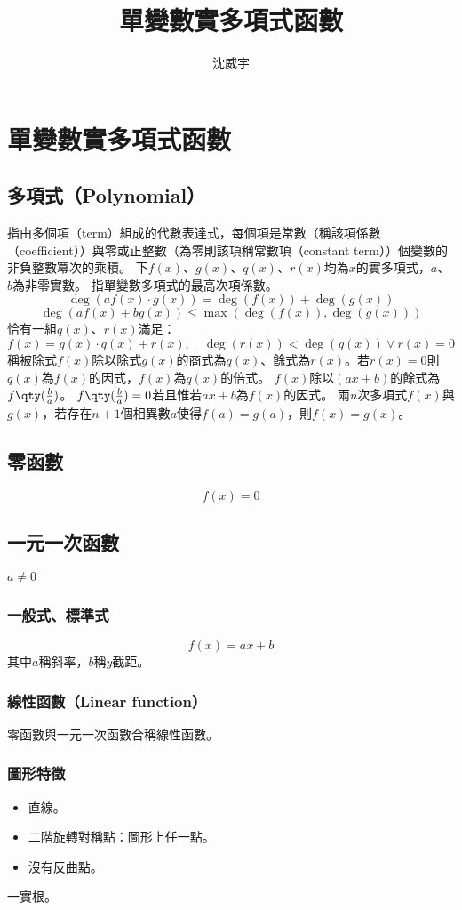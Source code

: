 \documentclass[a4paper,12pt]{report}
\begin{document}
\title{單變數實多項式函數}
\author{沈威宇}
\date{\temtoday}
\titletocdoc
\section{單變數實多項式函數}
\subsection{多項式（Polynomial）}
指由多個項（term）組成的代數表達式，每個項是常數（稱該項係數（coefficient））與零或正整數（為零則該項稱常數項（constant term））個變數的非負整數冪次的乘積。 
下$f(x)$、$g(x)$、$q(x)$、$r(x)$均為$x$的實多項式，$a$、$b$為非零實數。
指單變數多項式的最高次項係數。
\[\deg(af(x)\cdot g(x))=\deg(f(x))+\deg(g(x))\]
\[\deg(af(x)+bg(x))\leq\max(\deg(f(x)),\deg(g(x)))\]
恰有一組$q(x)$、$r(x)$滿足：
\[f(x)=g(x)\cdot q(x)+r(x),\quad\deg(r(x))<\deg(g(x))\lor r(x)=0\]
稱被除式$f(x)$除以除式$g(x)$的商式為$q(x)$、餘式為$r(x)$。若$r(x)=0$則$q(x)$為$f(x)$的因式，$f(x)$為$q(x)$的倍式。
$f(x)$除以$(ax+b)$的餘式為$f\qty(\frac{b}{a})$。
$f\qty(\frac{b}{a})=0$若且惟若$ax+b$為$f(x)$的因式。
兩$n$次多項式$f(x)$與$g(x)$，若存在$n+1$個相異數$a$使得$f(a)=g(a)$，則$f(x)=g(x)$。
\subsection{零函數}
\[f(x)=0\]
\subsection{一元一次函數}
$a\neq 0$
\subsubsection{一般式、標準式}
\[f(x)=ax+b\]
其中$a$稱斜率，$b$稱$y$截距。
\subsubsection{線性函數（Linear function）}
零函數與一元一次函數合稱線性函數。
\subsubsection{圖形特徵}
\begin{itemize}
\item 直線。
\item 二階旋轉對稱點：圖形上任一點。
\item 沒有反曲點。
\end{itemize}
一實根。
\end{document}
